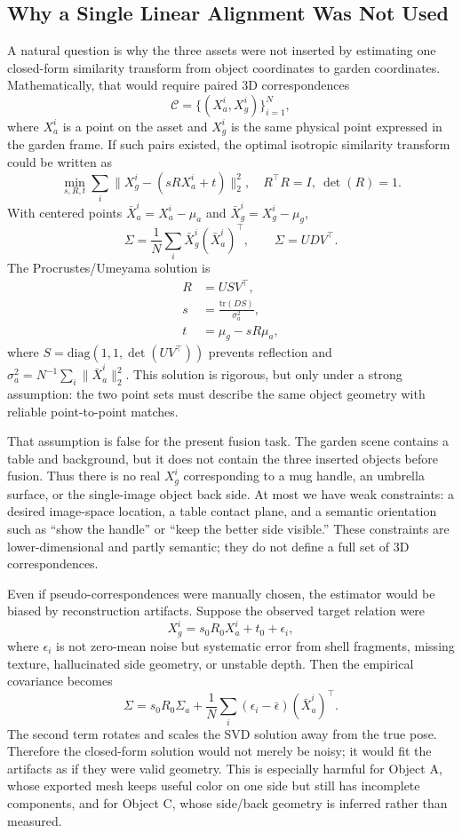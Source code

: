 \documentclass[10pt,twocolumn,letterpaper]{article}
\begin{document}
\subsection{Why a Single Linear Alignment Was Not Used}
A natural question is why the three assets were not inserted by estimating one closed-form similarity transform from object coordinates to garden coordinates.
Mathematically, that would require paired 3D correspondences
\[
\mathcal{C}=\{(X_a^i,X_g^i)\}_{i=1}^N,
\]
where $X_a^i$ is a point on the asset and $X_g^i$ is the same physical point expressed in the garden frame.
If such pairs existed, the optimal isotropic similarity transform could be written as
\[
\min_{s,R,t}\sum_i\|X_g^i-(sRX_a^i+t)\|_2^2,
\quad R^\top R=I,\ \det(R)=1.
\]
With centered points $\bar X_a^i=X_a^i-\mu_a$ and $\bar X_g^i=X_g^i-\mu_g$,
\[
\Sigma=\frac{1}{N}\sum_i \bar X_g^i(\bar X_a^i)^\top,\qquad
\Sigma=UDV^\top .
\]
The Procrustes/Umeyama solution is
\[
\begin{aligned}
R&=USV^\top,\\
s&=\frac{\mathrm{tr}(DS)}{\sigma_a^2},\\
t&=\mu_g-sR\mu_a,
\end{aligned}
\]
where $S=\mathrm{diag}(1,1,\det(UV^\top))$ prevents reflection and $\sigma_a^2=N^{-1}\sum_i\|\bar X_a^i\|_2^2$.
This solution is rigorous, but only under a strong assumption: the two point sets must describe the same object geometry with reliable point-to-point matches.

That assumption is false for the present fusion task.
The garden scene contains a table and background, but it does not contain the three inserted objects before fusion.
Thus there is no real $X_g^i$ corresponding to a mug handle, an umbrella surface, or the single-image object back side.
At most we have weak constraints: a desired image-space location, a table contact plane, and a semantic orientation such as ``show the handle'' or ``keep the better side visible.''
These constraints are lower-dimensional and partly semantic; they do not define a full set of 3D correspondences.

Even if pseudo-correspondences were manually chosen, the estimator would be biased by reconstruction artifacts.
Suppose the observed target relation were
\[
X_g^i=s_0R_0X_a^i+t_0+\epsilon_i,
\]
where $\epsilon_i$ is not zero-mean noise but systematic error from shell fragments, missing texture, hallucinated side geometry, or unstable depth.
Then the empirical covariance becomes
\[
\Sigma
=
s_0R_0\Sigma_a
+
\frac{1}{N}\sum_i(\epsilon_i-\bar\epsilon)(\bar X_a^i)^\top .
\]
The second term rotates and scales the SVD solution away from the true pose.
Therefore the closed-form solution would not merely be noisy; it would fit the artifacts as if they were valid geometry.
This is especially harmful for Object A, whose exported mesh keeps useful color on one side but still has incomplete components, and for Object C, whose side/back geometry is inferred rather than measured.
\end{document}
